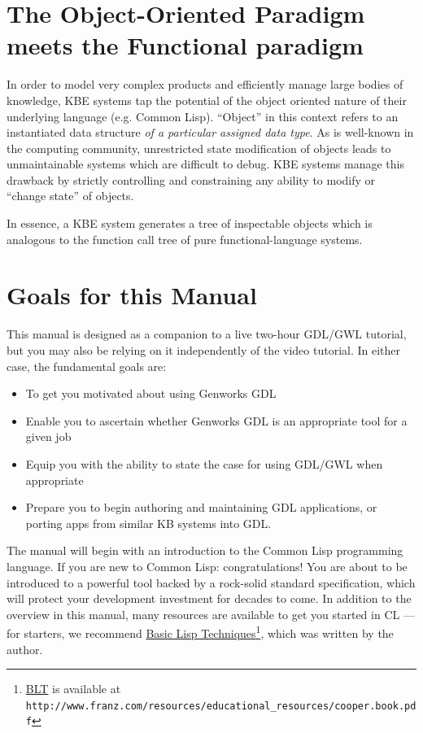 \documentclass [11pt]{book}
\begin{document}
\section{The Object-Oriented Paradigm meets the Functional paradigm}

\label{sec:theobject-orientedparadigmmeetsthefunctionalparadigm}

In order to model very complex products and efficiently manage
large bodies of knowledge, KBE systems tap the potential of the object
oriented nature of their underlying language (e.g. Common
Lisp). ``Object'' in this context refers to an instantiated data
structure \emph{of a particular assigned data type}. As is well-known in the computing community, unrestricted state
modification of objects leads to unmaintainable systems which are
difficult to debug. KBE systems manage this drawback by strictly
controlling and constraining any ability to modify or ``change state''
of objects.

In essence, a KBE system generates a tree of inspectable objects which
is analogous to the function call tree of pure functional-language
systems.

\section{Goals for this Manual}

\label{sec:goalsforthismanual}

This manual is designed as a companion to a live two-hour
GDL/GWL tutorial, but you may also be relying on it independently of the
video tutorial. In either case, the fundamental goals are:

\begin{itemize}

\item To get you motivated about using Genworks GDL

\item Enable you to ascertain whether Genworks GDL is an appropriate tool for a given job

\item Equip you with the ability to state the case for using GDL/GWL when appropriate

\item Prepare you to begin authoring and maintaining GDL
applications, or porting apps from similar KB systems into GDL.

\end{itemize}

The manual will begin with an introduction to the Common Lisp programming language. If you are new to Common Lisp:
congratulations! You are about to be introduced to a powerful tool
backed by a rock-solid standard specification, which will protect your
development investment for decades to come. In addition to the
overview in this manual, many resources are available to get you
started in CL --- for starters, we recommend 
\underline{Basic Lisp Techniques}\footnote{
\underline{BLT} is available at \texttt{http://www.franz.com/resources/educational\_resources/cooper.book.pdf}}, which was written by the author. 
\end{document}
